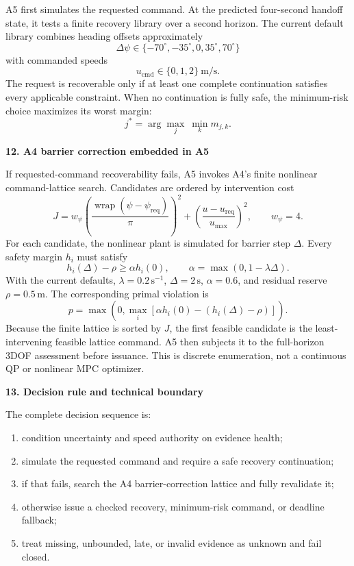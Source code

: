 \documentclass[10pt,a4paper]{article}
\newcommand{\sectionbar}[1]{%
  \vspace{4pt}%
  {\large\bfseries\color{hnavy}#1}\par
  \vspace{-2pt}{\color{hblue}\rule{\textwidth}{0.7pt}}\vspace{2pt}%
}
\begin{document}
A5 first simulates the requested command. At the predicted four-second handoff state, it tests a finite recovery library over a second horizon. The current default library combines heading offsets approximately
\begin{equation}
  \Delta\psi\in\{-70^\circ,-35^\circ,0,35^\circ,70^\circ\}
\end{equation}
with commanded speeds
\begin{equation}
  u_{\mathrm{cmd}}\in\{0,1,2\}\ \mathrm{m/s}.
\end{equation}
The request is recoverable only if at least one complete continuation satisfies every applicable constraint. When no continuation is fully safe, the minimum-risk choice maximizes its worst margin:
\begin{equation}
  j^*=\arg\max_j\ \min_k m_{j,k}.
\end{equation}

\sectionbar{12. A4 barrier correction embedded in A5}

If requested-command recoverability fails, A5 invokes A4's finite nonlinear command-lattice search. Candidates are ordered by intervention cost
\begin{equation}
  J=w_\psi\left(\frac{\operatorname{wrap}(\psi-\psi_{\mathrm{req}})}{\pi}\right)^2
  +\left(\frac{u-u_{\mathrm{req}}}{u_{\max}}\right)^2,
  \qquad w_\psi=4.
\end{equation}
For each candidate, the nonlinear plant is simulated for barrier step $\Delta$. Every safety margin $h_i$ must satisfy
\begin{equation}
  h_i(\Delta)-\rho\geq\alpha h_i(0),
  \qquad \alpha=\max(0,1-\lambda\Delta).
\end{equation}
With the current defaults, $\lambda=0.2\,\mathrm{s}^{-1}$, $\Delta=2\,\mathrm{s}$, $\alpha=0.6$, and residual reserve $\rho=0.5\,\mathrm{m}$. The corresponding primal violation is
\begin{equation}
  p=\max\left(0,\max_i\left[\alpha h_i(0)-(h_i(\Delta)-\rho)\right]\right).
\end{equation}
Because the finite lattice is sorted by $J$, the first feasible candidate is the least-intervening feasible lattice command. A5 then subjects it to the full-horizon 3DOF assessment before issuance. This is discrete enumeration, not a continuous QP or nonlinear MPC optimizer.

\sectionbar{13. Decision rule and technical boundary}

The complete decision sequence is:
\begin{enumerate}[leftmargin=7mm,itemsep=2pt,topsep=3pt]
  \item condition uncertainty and speed authority on evidence health;
  \item simulate the requested command and require a safe recovery continuation;
  \item if that fails, search the A4 barrier-correction lattice and fully revalidate it;
  \item otherwise issue a checked recovery, minimum-risk command, or deadline fallback;
  \item treat missing, unbounded, late, or invalid evidence as unknown and fail closed.
\end{enumerate}
\end{document}
